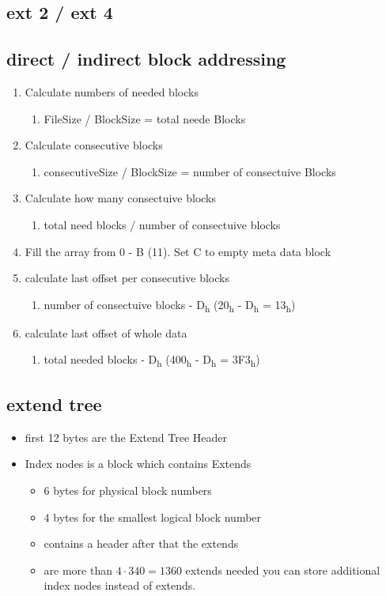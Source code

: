 \documentclass[11pt,twoside,landscape]{article}
\begin{document}
\begin{multicols}{3}
\section*{ext 2 / ext 4}
\subsection*{direct / indirect block addressing}
\begin{enumerate}
\item Calculate numbers of needed blocks
  \begin{enumerate}
  \item FileSize / BlockSize = total neede Blocks
  \end{enumerate}
\item Calculate consecutive blocks
  \begin{enumerate}
  \item consecutiveSize / BlockSize = number of consectuive Blocks
  \end{enumerate}
\item Calculate how many consectuive blocks
  \begin{enumerate}
  \item total need blocks / number of consectuive blocks
  \end{enumerate}
\item Fill the array from 0 - B (11). Set C to empty meta data block
\item calculate last offset per consecutive blocks
  \begin{enumerate}
  \item number of consectuive blocks - D\textsubscript{h} (20\textsubscript{h} - D\textsubscript{h} = 13\textsubscript{h})
  \end{enumerate}
\item calculate last offset of whole data
  \begin{enumerate}
  \item total needed blocks - D\textsubscript{h} (400\textsubscript{h} - D\textsubscript{h} = 3F3\textsubscript{h})
  \end{enumerate}
\end{enumerate}

\subsection*{extend tree}
\begin{itemize}
\item first 12 bytes are the Extend Tree Header
\item Index nodes is a block which contains Extends
  \begin{itemize}
  \item 6 bytes for physical block numbers
  \item 4 bytes for the smallest logical block number
  \item contains a header after that the extends
  \item are more than \(4 \cdot 340 = 1360\) extends needed you can store additional index nodes instead of extends.
  \end{itemize}
\end{itemize}

\end{multicols}
\end{document}
